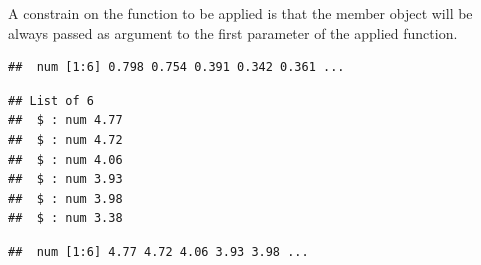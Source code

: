 \documentclass[krantz2]{krantz}\usepackage{knitr}%
\begin{document}
\begin{warningbox}
A constrain on the function to be applied is that the member object will be always passed as argument to the first parameter of the applied function.
\end{warningbox}

\begin{knitrout}\footnotesize
{}\color{fgcolor}\begin{kframe}
\begin{alltt}
\hlstd{(}\hlstd{)} 
 \hlkwb{<-} \hlstd{(}\hlstd{)} 
\end{alltt}
\begin{verbatim}
##  num [1:6] 0.798 0.754 0.391 0.342 0.361 ...
\end{verbatim}
\end{kframe}
\end{knitrout}

\begin{knitrout}\footnotesize
{}\color{fgcolor}\begin{kframe}
\begin{alltt}
 \hlkwb{<-} \hlstd{(}\hlstd{,} \hlstd{) \{} \hlopt{+} 
\end{alltt}
\end{kframe}
\end{knitrout}

\begin{knitrout}\footnotesize
{}\color{fgcolor}\begin{kframe}
\begin{alltt}
 \hlkwb{<-} \hlstd{(}     \hlstd{=} \hlstd{)}
\end{alltt}
\begin{verbatim}
## List of 6
##  $ : num 4.77
##  $ : num 4.72
##  $ : num 4.06
##  $ : num 3.93
##  $ : num 3.98
##  $ : num 3.38
\end{verbatim}
\end{kframe}
\end{knitrout}

\begin{knitrout}\footnotesize
{}\color{fgcolor}\begin{kframe}
\begin{alltt}
 \hlkwb{<-} \hlstd{(}     \hlstd{=} \hlstd{)}
\end{alltt}
\begin{verbatim}
##  num [1:6] 4.77 4.72 4.06 3.93 3.98 ...
\end{verbatim}
\end{kframe}
\end{knitrout}
\end{document}
